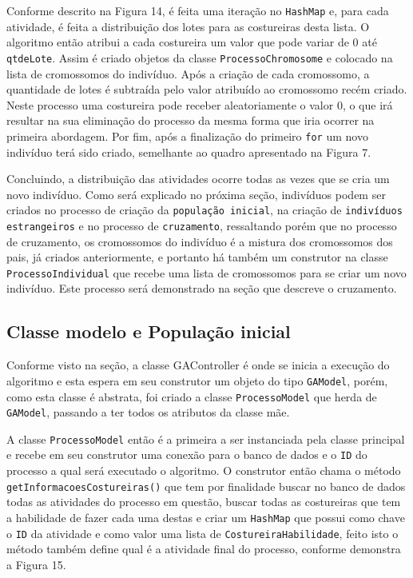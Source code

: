 \newpage
 
\par Conforme descrito na Figura 14, é feita uma iteração no
\texttt{HashMap} e, para cada atividade, é feita a distribuição dos lotes para
as costureiras desta lista. O algoritmo então atribui a cada costureira um valor
que pode variar de 0 até \texttt{qtdeLote}.
Assim é criado objetos da classe \texttt{ProcessoChromosome} e colocado na lista
de cromossomos do indivíduo. Após a criação de cada cromossomo, a quantidade de
lotes é subtraída pelo valor atribuído ao cromossomo recém criado.
Neste processo uma costureira pode receber aleatoriamente o valor 0, o que irá resultar na sua eliminação do processo da mesma forma
que iria ocorrer na primeira abordagem. Por fim, após a finalização do primeiro
\texttt{for} um novo indivíduo terá sido criado, semelhante ao quadro
apresentado na Figura 7.

\par Concluindo, a distribuição das atividades ocorre todas as vezes que se cria um novo indivíduo.
Como será explicado no próxima seção, indivíduos podem ser criados no processo
de criação da \texttt{população inicial}, na criação de \texttt{indivíduos estrangeiros} e no processo de \texttt{cruzamento}, ressaltando porém que no processo 
de cruzamento, os cromossomos do indivíduo é a mistura dos cromossomos dos pais,
já criados anteriormente, e portanto há também um construtor na classe \texttt{ProcessoIndividual} que recebe uma lista de cromossomos para se criar um novo indivíduo.
Este processo será demonstrado na seção que descreve o cruzamento.

\subsection {Classe modelo e População inicial}

\par Conforme visto na seção, a classe GAController é onde se inicia a execução do algoritmo e esta espera em seu 
construtor um objeto do tipo \texttt{GAModel}, porém, como esta classe é abstrata, foi criado a classe 
\texttt{ProcessoModel} que herda de \texttt{GAModel}, passando a ter todos os atributos
da classe mãe.

\par A classe \texttt{ProcessoModel} então é a primeira a ser instanciada pela classe principal e recebe em seu construtor
uma conexão para o banco de dados e o \texttt{ID} do processo a qual será
executado o algoritmo. O construtor então chama o método
\texttt{getInformacoesCostureiras()} que tem por finalidade buscar no banco de dados todas as atividades do 
processo em questão, buscar todas as costureiras que tem a habilidade de fazer
cada uma destas e criar um \texttt{HashMap} que possui como chave o \texttt{ID} da atividade e como valor uma 
lista de \texttt{CostureiraHabilidade}, feito isto o método 
também define qual é a atividade final do processo, conforme demonstra a Figura
15.


